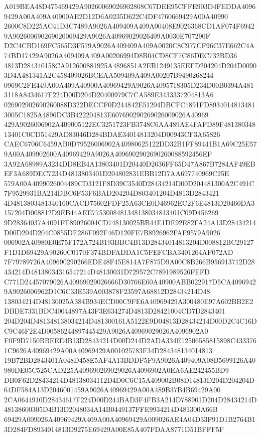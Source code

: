 \documentclass[UTF8,fontset=fandol,zihao=-4,a4paper]{ctexart}
\begin{document}
{{A019BEA48D475469429A90260069026902808C67DEE95CFFE903D4FEDDA40969429A00A409A40900AE2D12D6A0235D622C4DF4760669429A00A40990
2600C8D225AC41D3C7489A9026A409409A409A00408E9026368CD1AF074F69429A902600690269020069429A9026A40969029026409A0030E707290F
D2C4CBD169FC565D3F579A9026A409409A409A0020C8C977CF96C37E662C4A74BD17429A9026A409409A409A00206994D8B04CD8CF7C86DEC732BD36
4813D284340158CA912600881925A4896851A2EB1249135EEFD204204D204D00903D4A481341A2C458409026BCEAA509409A409A00207B9490268244
0969C2FE449A00A409A40900A40969429A9026A4095718305D234D00B0394A4813118A8434617F224D00D204D20400979C7CA589E3433337204813A6
026902902690260088D322DECCF0D244842E51204DBCFC1891FD89340148134813005C1825A4896DC3B422204813E607690290269026009026A40969
429A9026006902A409005122EC3251723FB3748C6AA489AE4FAFD89F48138034813401C0CD51429AD83046D284BDAE34014813204D00943CF3A65826
CAEC6706C6459AB0D79526006902A40980625122DD32B1FF89441B1A69C25E579A00A409902600A40969429A9026A4096902902690260088592456EF
3A92A68989A3234DD8EB4A13803401D20440D2636FF65D47A867B7284AF49EBEF3A689DEC7234D4813803401D204802831EBB12D7AA697740969C25E
579A00A4099026004489CD3121F8D39C3540D28434214D00D204481300A2C491C7F9529931BA214DBC6F53F6BAD204204D803401204D4813D2843421
4D4813803481340160CACD75602FDF25A63CE0D46962EC2F6E4813D20460DA3157204D008812D9EB44AEE7753008481348138034813401C09D456269
9D28364037A4091FE89026004CD748130025BB44E1DE92E82FA24A13D28434214D00D204D204C0855DE286F092F46D120FE7B8926962FAF9579A9026
006902A40980E0E75F172A724B193BBC4B13D28434014813204D008812BC29127F1D1D69429A90260C0170F374BDFADDA1C5FEFCBA3401204AF072AD
7F79789726A409690290266EDE48F45E814A7F875D9A00C8B266B956913712D28434214D48138034316547214D48130031D729572C7891989526FEFD
C771D24457079026A40969029026666D30766E60A40900ABB022917D5CA40969429A9026006962D1C6C33E539A003878F23597A68812D28434214D48
138034214D48130025A384B934ECD00C9FE6A40969429A300480E97A602BB2E2DBDE7331BDC40044897A43F3E634274D4813D28421004CD7D2843401
204D204D481348138034214D481300161A5122E9D04813D28434214D00D2C4C16DC9C46F2E4D00586244897445429A9026A40969029026A4096902A0
F0F9D7150BBEEE4B13D28434214D00D244D2ADA334E12506585815898C4333761C9626A40969429A00A40969429A001025783F34D284348134014813
19B72BD2843401A048D458E5AF4A13BDDF5F9A9026A409409A08B5699126A40980DE05C525CAD225A409690269029026A4096902A0EA6AE242455BD9
DB0F62D28434214D48138034112D4D0C6C15A409002B08D14813D204D204204D64DF584A13D2046001459A9026A40969429A00A489B37B4B69429A00
2CA0644910D28434617F224D00D244BAD3F4FB3A214D788901D204D28434214D48138600305D4B13D2048034A14B0449137FFE9934214D481300A66B
69429A009026A40969429A409A00A40969429A009026AE4A04D33F91D1B2764B13D284FD8934014813D9275E69429A00E85A407FDAA8771D51BFFF5F
}}
\end{document}
